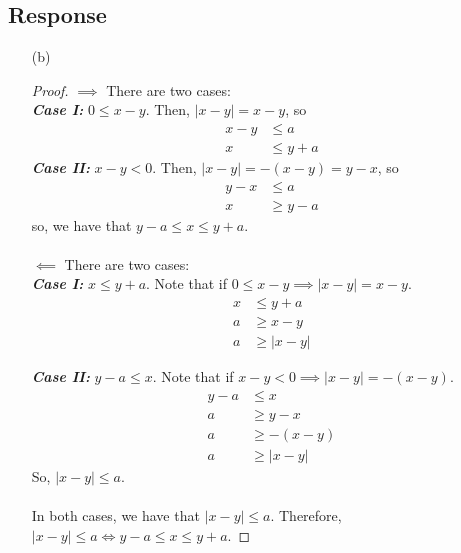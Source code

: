 \documentclass[13pt]{article}
\begin{document}
\subsection*{Response}
\begin{enumerate}
\item [(b)]
  \begin{proof}
    $\implies$ There are two cases: \\
    \textit{\textbf{Case I:}} $0 \leq x - y$. Then, $|x - y| = x - y$, so
    \begin{align*}
      x - y &\leq a \\
      x &\leq y + a
    \end{align*}
    \textit{\textbf{Case II:}} $x - y < 0$. Then, $|x - y| = -(x - y) = y - x$, so
    \begin{align*}
      y - x &\leq a \\
      x &\geq y - a
    \end{align*}
    so, we have that $y - a \leq x \leq y + a$. \\ \\
    $\impliedby$ There are two cases: \\
    \textit{\textbf{Case I:}} $x \leq y + a$. Note that if $0 \leq x - y \implies |x - y| = x - y$.
    \begin{align*}
      x &\leq y + a \\
      a &\geq x - y \\
      a &\geq |x - y|
    \end{align*}

    \textit{\textbf{Case II:}} $y - a \leq x$. Note that if $x - y < 0 \implies |x - y| = -(x - y)$.
    \begin{align*}
      y - a &\leq x \\
      a &\geq y - x \\
      a &\geq -(x - y) \\
      a &\geq |x - y|
    \end{align*}
    So, $|x - y| \leq a$. \\ \\
    In both cases, we have that $|x - y| \leq a$. Therefore, $|x - y| \leq a \iff y - a \leq x \leq
    y + a$.
  \end{proof}


\end{enumerate}
\end{document}
